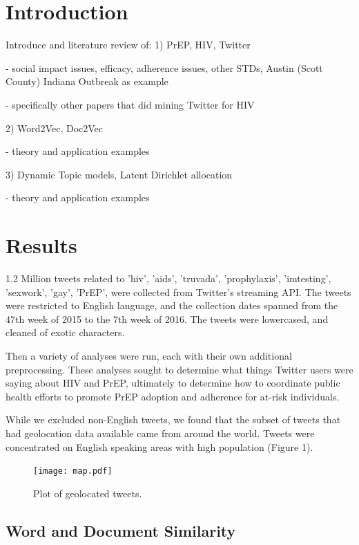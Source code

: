 \documentclass{sig-alternate-05-2015}
\begin{document}
\section{Introduction}

Introduce and literature review of:
1) PrEP, HIV, Twitter

 - social impact issues, efficacy, adherence issues, other STDs, Austin (Scott County) Indiana Outbreak as example
 
 - specifically other papers that did mining Twitter for HIV


2) Word2Vec, Doc2Vec

 - theory and application examples

3) Dynamic Topic models, Latent Dirichlet allocation

- theory and application examples

\section{Results}

1.2 Million tweets related to 'hiv', 'aids', 'truvada', 'prophylaxis', 'imtesting', 'sexwork', 'gay', 'PrEP', were collected from Twitter's streaming API. The tweets were restricted to English language, and the collection dates spanned from the 47th week of 2015 to the 7th week of 2016. The tweets were lowercased, and cleaned of exotic characters.

Then a variety of analyses were run, each with their own additional preprocessing. These analyses sought to determine what things Twitter users were saying about HIV and PrEP, ultimately to determine how to coordinate public health efforts to promote PrEP adoption and adherence for at-risk individuals.

While we excluded non-English tweets, we found that the subset of tweets that had geolocation data available came from around the world. Tweets were concentrated on English speaking areas with high population (Figure 1).

\begin{figure}
\centering
\texttt{[image: map.pdf]}
\caption{Plot of geolocated tweets.}
\end{figure}

\subsection{Word and Document Similarity}

\end{document}

